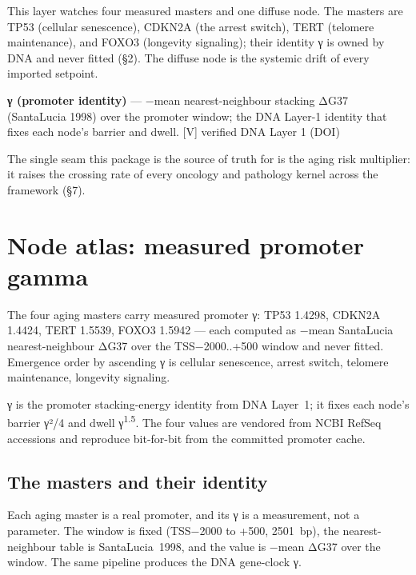 \documentclass[11pt]{article}
\begin{document}
This layer watches four measured masters and one diffuse node. The masters are TP53 (cellular senescence), CDKN2A (the arrest switch), TERT (telomere maintenance), and FOXO3 (longevity signaling); their identity γ is owned by DNA and never fitted (§2). The diffuse node is the systemic drift of every imported setpoint.

\begin{vpbox}\textbf{γ (promoter identity)} — −mean nearest-neighbour stacking ΔG37 (SantaLucia 1998) over the promoter window; the DNA Layer-1 identity that fixes each node's barrier and dwell. [V] verified DNA Layer 1 (DOI)\end{vpbox}

The single seam this package is the source of truth for is the aging risk multiplier: it raises the crossing rate of every oncology and pathology kernel across the framework (§7).

\section{Node atlas: measured promoter gamma}

\begin{answerbox}The four aging masters carry measured promoter γ: TP53 1.4298, CDKN2A 1.4424, TERT 1.5539, FOXO3 1.5942 — each computed as −mean SantaLucia nearest-neighbour ΔG37 over the TSS−2000..+500 window and never fitted. Emergence order by ascending γ is cellular senescence, arrest switch, telomere maintenance, longevity signaling.\end{answerbox}

\begin{abstractbox}γ is the promoter stacking-energy identity from DNA Layer 1; it fixes each node's barrier γ²/4 and dwell γ\textsuperscript{1.5}. The four values are vendored from NCBI RefSeq accessions and reproduce bit-for-bit from the committed promoter cache.\end{abstractbox}

\subsection*{The masters and their identity}

Each aging master is a real promoter, and its γ is a measurement, not a parameter. The window is fixed (TSS−2000 to +500, 2501 bp), the nearest-neighbour table is SantaLucia 1998, and the value is −mean ΔG37 over the window. The same pipeline produces the DNA gene-clock γ.
\end{document}
